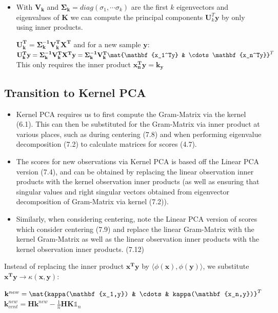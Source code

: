 \documentclass[english]{latex4ei/latex4ei_sheet}
\begin{document}
\begin{sectionbox}
\begin{itemize}
\begin{emphbox}
\end{emphbox}
\item With $\mathbf{V_k}$ and $\mathbf{\Sigma_k}=diag(\sigma_1, \cdots\sigma_k)$ are the first $k$ eigenvectors and eigenvalues of $\mathbf{K}$ we can compute the principal components $\mathbf{U}^T_k\mathbf{y}$ by only using inner products.
\begin{emphbox}
    $\mathbf{U_k^T}=\mathbf{\Sigma_k^{-1}V_k^TX^T}$ and for a new sample $\mathbf{y}$:\\
    $\mathbf{U_k^Ty}=\mathbf{\Sigma_k^{-1}V_k^TX^Ty}=\mathbf{\Sigma_k^{-1}V_k^T}\mat{\mathbf{x_1^Ty} & \cdots \mathbf{x_n^Ty}}^T$\\
    This only requires the inner product $\mathbf{x_n^Ty=k_y}$
\end{emphbox}
\end{itemize}

\subsection{Transition to Kernel PCA}
\begin{itemize}
\item Kernel PCA requires us to first compute the Gram-Matrix via the kernel (6.1). This can then be substituted for the Gram-Matrix via inner product at various places, such as during centering (7.8) and when performing eigenvalue decomposition (7.2) to calculate matrices for scores (4.7).
\item The scores for new observations via Kernel PCA is based off the Linear PCA version (7.4), and can be obtained by replacing the linear observation inner products with the kernel observation inner products (as well as ensuring that singular values and right singular vectors obtained from eigenvector decomposition of Gram-Matrix via kernel (7.2)).
\item Similarly, when considering centering, note the Linear PCA version of scores which consider centering (7.9) and replace the linear Gram-Matrix with the kernel Gram-Matrix as well as the linear observation inner products with the kernel observation inner products. (7.12)
\end{itemize}
Instead of replacing the inner product $\mathbf{x^Ty}$ by $\langle\phi(\mathbf{x}),\phi(\mathbf{y})\rangle$, we substitute $\mathbf{x^Ty}\rightarrow\kappa(\mathbf{x,y})$:
\begin{emphbox}
    $\mathbf{k}^{new}=\mat{kappa(\mathbf{x_1,y}) & \cdots & kappa(\mathbf{x_n,y})}^T$\\
    $\mathbf{k}_{cent}^{new}=\mathbf{Hk}_{}^{new}-\frac{1}{n}\mathbf{HK}\mathds{1}_n$
\end{emphbox}
\end{sectionbox}
\end{document}
